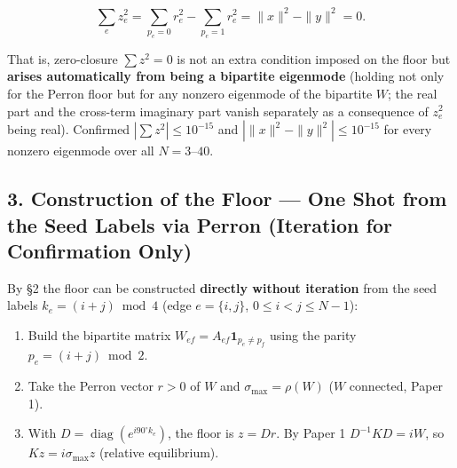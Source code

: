 \documentclass[
  a4paper,
]{ltjsarticle}
\providecommand{\tightlist}{%
  \setlength{\itemsep}{0pt}\setlength{\parskip}{0pt}}
\begin{document}
\[\sum_e z_e^2=\sum_{p_e=0}r_e^2-\sum_{p_e=1}r_e^2=\|x\|^2-\|y\|^2=0.\]

That is, zero-closure \(\sum z^2=0\) is not an extra condition imposed
on the floor but \textbf{arises automatically from being a bipartite
eigenmode} (holding not only for the Perron floor but for any nonzero
eigenmode of the bipartite \(W\); the real part and the cross-term
imaginary part vanish separately as a consequence of \(z_e^2\) being
real). Confirmed \(|\sum z^2|\le10^{-15}\) and
\(|\|x\|^2-\|y\|^2|\le10^{-15}\) for every nonzero eigenmode over all
\(N=3\)--\(40\).

\subsection{3. Construction of the Floor --- One Shot from the Seed
Labels via Perron (Iteration for Confirmation
Only)}\label{construction-of-the-floor-one-shot-from-the-seed-labels-via-perron-iteration-for-confirmation-only}

By §2 the floor can be constructed \textbf{directly without iteration}
from the seed labels \(k_e=(i+j)\bmod4\) (edge \(e=\{i,j\}\),
\(0\le i<j\le N-1\)):

\begin{enumerate}
\def\labelenumi{\arabic{enumi}.}
\tightlist
\item
  Build the bipartite matrix \(W_{ef}=A_{ef}\mathbf 1_{p_e\neq p_f}\)
  using the parity \(p_e=(i+j)\bmod2\).
\item
  Take the Perron vector \(r>0\) of \(W\) and \(\sigma_{\max}=\rho(W)\)
  (\(W\) connected, Paper 1).
\item
  With \(D=\operatorname{diag}(e^{i90^\circ k_e})\), the floor is
  \(z=Dr\). By Paper 1 \(D^{-1}KD=iW\), so \(Kz=i\sigma_{\max}z\)
  (relative equilibrium).
\end{enumerate}
\end{document}
